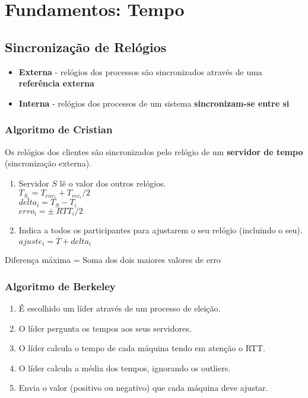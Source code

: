 \documentclass[12pt]{article}
\begin{document}
\section{Fundamentos: Tempo}

\subsection{Sincronização de Relógios}

\begin{itemize}
    \item \textbf{Externa} - relógios dos processos são sincronizados através de uma \textbf{referência externa}
    \item \textbf{Interna} - relógios dos processos de um sistema \textbf{sincronizam-se entre si}
\end{itemize}

\subsubsection{Algoritmo de Cristian}

Os relógios dos clientes são sincronizados pelo relógio de um \textbf{servidor de tempo} (sincronização externa).

\begin{enumerate}
    \item Servidor $S$ lê o valor dos outros relógios. \\[2pt]
        $T_{S_i} = T_{env_i} + T_{rec_i}/2$ \\
        $delta_i = T_S - T_i$ \\
        $erro_i = \pm\ RTT_i/2$
    \item Indica a todos os participantes para ajustarem o seu relógio (incluindo o seu). \\[2pt]
        $ajuste_i = \overline{T} + delta_i $
\end{enumerate}

Diferença máxima = Soma dos dois maiores valores de erro

\subsubsection{Algoritmo de Berkeley}

\begin{enumerate}
    \item É escolhido um líder através de um processo de eleição.
    \item O líder pergunta os tempos aos seus servidores.
    \item O líder calcula o tempo de cada máquina tendo em atenção o RTT.
    \item O líder calcula a média dos tempos, ignorando os outliers.
    \item Envia o valor (positivo ou negativo) que cada máquina deve ajustar.
\end{enumerate}
\end{document}
